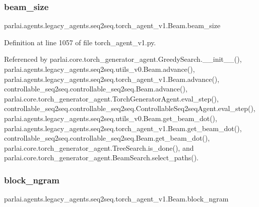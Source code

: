 \subsubsection{\texorpdfstring{beam\+\_\+size}{beam\_size}}
{\footnotesize\ttfamily parlai.\+agents.\+legacy\+\_\+agents.\+seq2seq.\+torch\+\_\+agent\+\_\+v1.\+Beam.\+beam\+\_\+size}



Definition at line 1057 of file torch\+\_\+agent\+\_\+v1.\+py.



Referenced by parlai.\+core.\+torch\+\_\+generator\+\_\+agent.\+Greedy\+Search.\+\_\+\+\_\+init\+\_\+\+\_\+(), parlai.\+agents.\+legacy\+\_\+agents.\+seq2seq.\+utils\+\_\+v0.\+Beam.\+advance(), parlai.\+agents.\+legacy\+\_\+agents.\+seq2seq.\+torch\+\_\+agent\+\_\+v1.\+Beam.\+advance(), controllable\+\_\+seq2seq.\+controllable\+\_\+seq2seq.\+Beam.\+advance(), parlai.\+core.\+torch\+\_\+generator\+\_\+agent.\+Torch\+Generator\+Agent.\+eval\+\_\+step(), controllable\+\_\+seq2seq.\+controllable\+\_\+seq2seq.\+Controllable\+Seq2seq\+Agent.\+eval\+\_\+step(), parlai.\+agents.\+legacy\+\_\+agents.\+seq2seq.\+utils\+\_\+v0.\+Beam.\+get\+\_\+beam\+\_\+dot(), parlai.\+agents.\+legacy\+\_\+agents.\+seq2seq.\+torch\+\_\+agent\+\_\+v1.\+Beam.\+get\+\_\+beam\+\_\+dot(), controllable\+\_\+seq2seq.\+controllable\+\_\+seq2seq.\+Beam.\+get\+\_\+beam\+\_\+dot(), parlai.\+core.\+torch\+\_\+generator\+\_\+agent.\+Tree\+Search.\+is\+\_\+done(), and parlai.\+core.\+torch\+\_\+generator\+\_\+agent.\+Beam\+Search.\+select\+\_\+paths().

\mbox{\label{classparlai_1_1agents_1_1legacy__agents_1_1seq2seq_1_1torch__agent__v1_1_1Beam_aa2ba93350ee7aa9ab2ae5ba01c1c0c1e}} 
\subsubsection{\texorpdfstring{block\+\_\+ngram}{block\_ngram}}
{\footnotesize\ttfamily parlai.\+agents.\+legacy\+\_\+agents.\+seq2seq.\+torch\+\_\+agent\+\_\+v1.\+Beam.\+block\+\_\+ngram}



